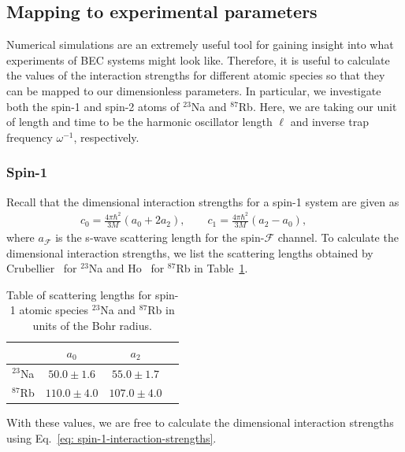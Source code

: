 \subsection{\label{subsec: experimental-params}
Mapping to experimental parameters}
Numerical simulations are an extremely useful tool for gaining insight into
what experiments of BEC systems might look like.
Therefore, it is useful to calculate the values of the interaction strengths
for different atomic species so that they can be mapped to our dimensionless
parameters.
In particular, we investigate both the spin-1 and spin-2 atoms of \( ^{23}\)Na
and \( ^{87}\)Rb.
Here, we are taking our unit of length and time to be the harmonic oscillator
length \(\ell \) and inverse trap frequency \(\omega^{-1}\), respectively.

\subsubsection{Spin-1}
Recall that the dimensional interaction strengths for a spin-1 system are given
as
\begin{align}\label{eq: spin-1-interaction-strengths}
    c_0 = \frac{4\pi\hbar^2}{3M}(a_0+2a_2), \qquad
    c_1 = \frac{4\pi\hbar^2}{3M}(a_2-a_0), \qquad
\end{align}
where \(a_\mathcal{F}\) is the s-wave scattering length for the
spin-\(\mathcal{F}\) channel.
To calculate the dimensional interaction strengths, we list the scattering
lengths obtained by Crubellier~\cite{Crubellier1999} for \( ^{23}\)Na and
Ho~\cite{Ho1998} for \( ^{87}\)Rb in
Table~\ref{table: scaterring-lengths-spin-1}.
\begin{table}
    \centering
    \begin{tabular}{ cccc } 
     \toprule
      & \(a_0\) & \(a_2\) \\
      \midrule
      \( ^{23}\)Na & \(50.0\pm 1.6\) & \(55.0\pm 1.7\) \\ 
      \( ^{87}\)Rb & \(110.0\pm 4.0\) & \(107.0\pm 4.0\) \\
      \bottomrule
    \end{tabular}
    \caption[Scattering lengths for spin-1 atomic species \( ^{23}\)Na and
    \( ^{87}\)Rb]{\label{table: scaterring-lengths-spin-1}Table of scattering
    lengths for spin-1 atomic species \( ^{23}\)Na and \( ^{87}\)Rb in units of
    the Bohr radius.}
\end{table}
With these values, we are free to calculate the dimensional interaction
strengths using Eq.~\eqref{eq: spin-1-interaction-strengths}.
